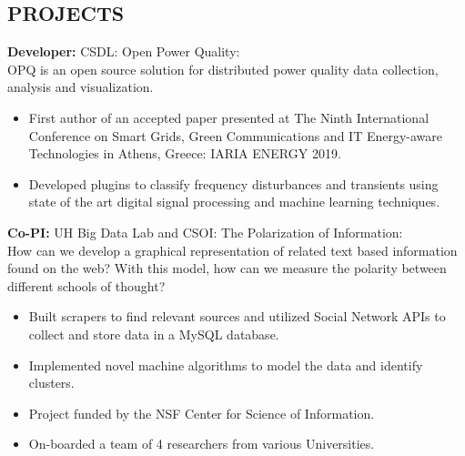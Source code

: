\documentclass[margin]{res}
\begin{document}
\begin{resume}

\section{PROJECTS}
\par
\textbf{Developer:} CSDL: Open Power Quality: \\
OPQ is an open source solution for distributed power quality data collection, analysis and visualization.
\begin{itemize}
\item First author of an accepted paper presented at The Ninth International Conference on Smart Grids, Green Communications and IT Energy-aware Technologies in Athens, Greece: IARIA ENERGY 2019.
\item Developed plugins to classify frequency disturbances and transients using state of the art digital signal processing and machine learning techniques.
\end{itemize}

\par
\textbf{Co-PI:} UH Big Data Lab and CSOI: The Polarization of Information:\\
How can we develop a graphical representation of related text based information found on the web? With this model, how can we measure the polarity between different schools of thought?
\begin{itemize}
\item Built scrapers to find relevant sources and utilized Social Network APIs to collect and store data in a MySQL database.
\item Implemented novel machine algorithms to model the data and identify clusters.
\item Project funded by the NSF Center for Science of Information.
\item On-boarded a team of 4 researchers from various Universities.
\end{itemize}



\end{resume}
\end{document}
